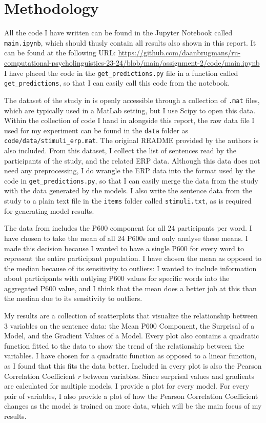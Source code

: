 \documentclass{IEEEtran}
\begin{document}
\section{Methodology}
All the code I have written can be found in the Jupyter Notebook called \texttt{main.ipynb}, which should thusly contain all results also shown in this report.
It can be found at the following URL: \url{https://github.com/daanbrugmans/ru-computational-psycholinguistics-23-24/blob/main/assignment-2/code/main.ipynb}
I have placed the code in the \texttt{get\_predictions.py} file in a function called \texttt{get\_predictions}, so that I can easily call this code from the notebook.

The dataset of the study in \cite{frank2015erp} is openly accessible through a collection of \texttt{.mat} files, which are typically used in a MatLab setting, but I use Scipy to open this data.
Within the collection of code I hand in alongside this report, the raw data file I used for my experiment can be found in the \texttt{data} folder as \texttt{code/data/stimuli\_erp.mat}.
The original README provided by the authors is also included.
From this dataset, I collect the list of sentences read by the participants of the study, and the related ERP data.
Although this data does not need any preprocessing, I do wrangle the ERP data into the format used by the code in \texttt{get\_predictions.py}, so that I can easily merge the data from the study with the data generated by the models.
I also write the sentence data from the study to a plain text file in the \texttt{items} folder called \texttt{stimuli.txt}, as is required for generating model results.

The data from \cite{frank2015erp} includes the P600 component for all 24 participants per word.
I have chosen to take the mean of all 24 P600s and only analyse these means.
I made this decision because I wanted to have a single P600 for every word to represent the entire participant population.
I have chosen the mean as opposed to the median because of its sensitivity to outliers: I wanted to include information about participants with outlying P600 values for specific words into the aggregated P600 value, and I think that the mean does a better job at this than the median due to its sensitivity to outliers.

My results are a collection of scatterplots that visualize the relationship between 3 variables on the sentence data: the Mean P600 Component, the Surprisal of a Model, and the Gradient Values of a Model.
Every plot also contains a quadratic function fitted to the data to show the trend of the relationship between the variables.
I have chosen for a quadratic function as opposed to a linear function, as I found that this fits the data better.
Included in every plot is also the Pearson Correlation Coefficient \textit{r} between variables.
Since surprisal values and gradients are calculated for multiple models, I provide a plot for every model.
For every pair of variables, I also provide a plot of how the Pearson Correlation Coefficient changes as the model is trained on more data, which will be the main focus of my results.
\end{document}
